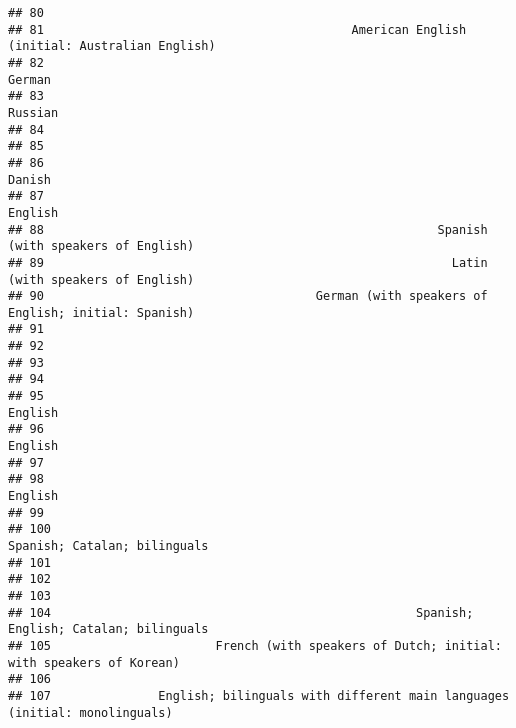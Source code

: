 \documentclass[
  english,
  man]{apa6}
\begin{document}
\begin{verbatim}
## 80                                                                                         
## 81                                           American English (initial: Australian English)
## 82                                                                                   German
## 83                                                                                  Russian
## 84                                                                                         
## 85                                                                                         
## 86                                                                                   Danish
## 87                                                                                  English
## 88                                                       Spanish (with speakers of English)
## 89                                                         Latin (with speakers of English)
## 90                                      German (with speakers of English; initial: Spanish)
## 91                                                                                         
## 92                                                                                         
## 93                                                                                         
## 94                                                                                         
## 95                                                                                  English
## 96                                                                                  English
## 97                                                                                         
## 98                                                                                  English
## 99                                                                                         
## 100                                                            Spanish; Catalan; bilinguals
## 101                                                                                        
## 102                                                                                        
## 103                                                                                        
## 104                                                   Spanish; English; Catalan; bilinguals
## 105                       French (with speakers of Dutch; initial: with speakers of Korean)
## 106                                                                                        
## 107               English; bilinguals with different main languages (initial: monolinguals)

\end{verbatim}
\end{document}
